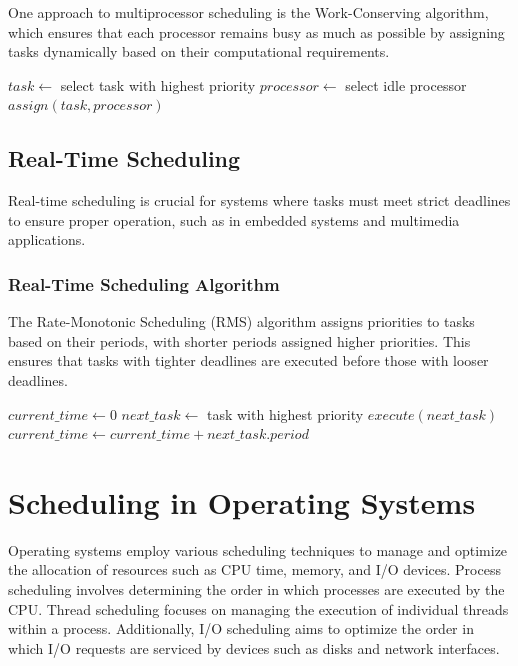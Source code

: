 \documentclass[12pt]{book} %
\begin{document}
One approach to multiprocessor scheduling is the Work-Conserving algorithm, which ensures that each processor remains busy as much as possible by assigning tasks dynamically based on their computational requirements.
\FloatBarrier
\begin{algorithm}
\caption{Work-Conserving Multiprocessor Scheduling}
\begin{algorithmic}[1]
\State $task \gets$ select task with highest priority
\State $processor \gets$ select idle processor
\State $assign(task, processor)$
\EndWhile
\EndProcedure
\end{algorithmic}
\end{algorithm}

\subsection{Real-Time Scheduling}

Real-time scheduling is crucial for systems where tasks must meet strict deadlines to ensure proper operation, such as in embedded systems and multimedia applications.

\subsubsection{Real-Time Scheduling Algorithm}

The Rate-Monotonic Scheduling (RMS) algorithm assigns priorities to tasks based on their periods, with shorter periods assigned higher priorities. This ensures that tasks with tighter deadlines are executed before those with looser deadlines.
\FloatBarrier
\begin{algorithm}
\caption{Rate-Monotonic Scheduling (RMS)}
\begin{algorithmic}[1]
\State $current\_time \gets 0$
\State $next\_task \gets$ task with highest priority
\State $execute(next\_task)$
\State $current\_time \gets current\_time + next\_task.period$
\EndWhile
\EndProcedure
\end{algorithmic}
\end{algorithm}

\section{Scheduling in Operating Systems}
Operating systems employ various scheduling techniques to manage and optimize the allocation of resources such as CPU time, memory, and I/O devices. Process scheduling involves determining the order in which processes are executed by the CPU. Thread scheduling focuses on managing the execution of individual threads within a process. Additionally, I/O scheduling aims to optimize the order in which I/O requests are serviced by devices such as disks and network interfaces.
\end{document}
